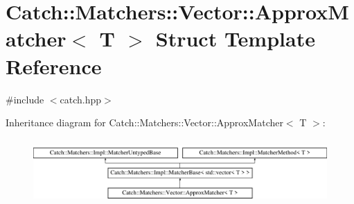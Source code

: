 \hypertarget{struct_catch_1_1_matchers_1_1_vector_1_1_approx_matcher}{}\section{Catch\+::Matchers\+::Vector\+::Approx\+Matcher$<$ T $>$ Struct Template Reference}
\label{struct_catch_1_1_matchers_1_1_vector_1_1_approx_matcher}


{\ttfamily \#include $<$catch.\+hpp$>$}

Inheritance diagram for Catch\+::Matchers\+::Vector\+::Approx\+Matcher$<$ T $>$\+:\begin{figure}[H]
\begin{center}
\leavevmode
\includegraphics[height=2.514970cm]{struct_catch_1_1_matchers_1_1_vector_1_1_approx_matcher}
\end{center}
\end{figure}
